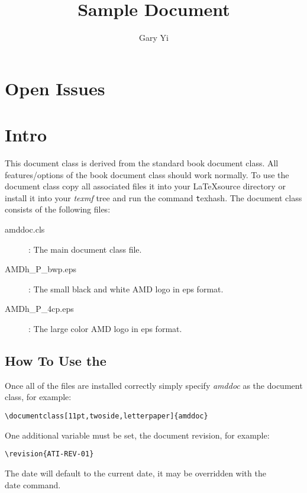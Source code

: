 \documentclass[11pt,twoside,letterpaper]{amddoc}
\title{Sample Document}
\author{Gary Yi}
\begin{document}
\frontmatter
\maketitle

\tableofcontents
\listoffigures
\listoftables

\chapter{Open Issues}


\mainmatter
\chapter[Introduction]{Intro}
This document class is derived from the standard book document class.  All features/options of the book document class should work normally.  To use the document class copy all associated files it into your \LaTeX  source directory or install it into your \emph{texmf} tree and run the command {\texttt texhash}.  The document class consists of the following files:

\begin{description}
\item[amddoc.cls]: The main document class file.
\item[AMDh_P_bwp.eps]: The small black and white AMD logo in eps format.
\item[AMDh_P_4cp.eps]: The large color AMD logo in eps format.
\end{description}

\section{How To Use the}
Once all of the files are installed correctly simply specify \emph{amddoc} as the document class, for example:

\begin{verbatim}
\documentclass[11pt,twoside,letterpaper]{amddoc}
\end{verbatim}

One additional variable must be set, the document revision, for example:

\begin{verbatim}
\revision{ATI-REV-01}
\end{verbatim}

The date will default to the current date, it may be overridden with the {\texttt \\date} command.




\appendix
% 
% 
\end{document}
